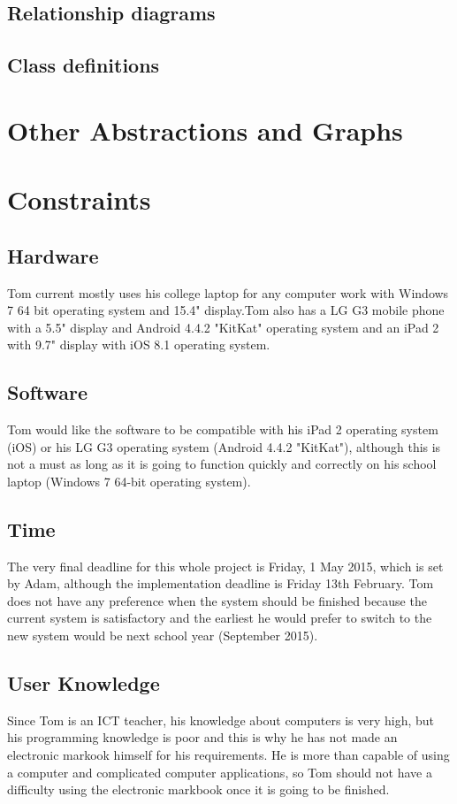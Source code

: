 \subsection{Relationship diagrams}

\subsection{Class definitions}

\section{Other Abstractions and Graphs}

\section{Constraints}
\subsection{Hardware}
Tom current mostly uses his college laptop for any computer work with Windows 7 64 bit operating system and 15.4" display.Tom also has a LG G3 mobile phone with a 5.5" display and Android 4.4.2 "KitKat" operating system and an iPad 2 with 9.7" display with iOS 8.1 operating system.

\subsection{Software}
Tom would like the software to be compatible with his iPad 2 operating system (iOS) or his LG G3 operating system (Android 4.4.2 "KitKat"), although this is not a must as long as it is going to function quickly and correctly on his school laptop (Windows 7 64-bit operating system).

\subsection{Time}
The very final deadline for this whole project is Friday, 1 May 2015, which is set by Adam, although the implementation deadline is Friday 13th February.
Tom does not have any preference when the system should be finished because the current system is satisfactory and the earliest he would prefer to switch to the new system would be next school year (September 2015).

\subsection{User Knowledge}
Since Tom is an ICT teacher, his knowledge about computers is very high, but his programming knowledge is poor and this is why he has not made an electronic markook himself for his requirements. He is more than capable of using a computer and complicated computer applications, so Tom should not have a difficulty using the electronic markbook once it is going to be finished.

